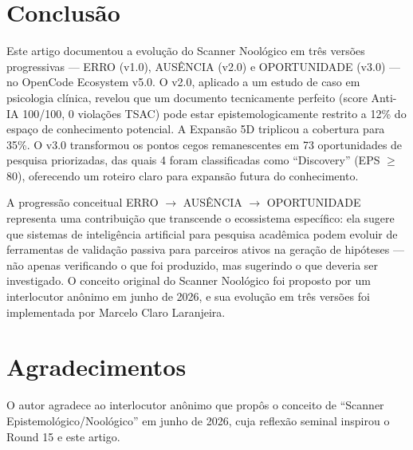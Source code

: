 \documentclass[12pt,a4paper]{article}
\begin{document}
\section{Conclusão}

Este artigo documentou a evolução do Scanner Noológico em três versões progressivas --- ERRO (v1.0), AUSÊNCIA (v2.0) e OPORTUNIDADE (v3.0) --- no OpenCode Ecosystem v5.0. O v2.0, aplicado a um estudo de caso em psicologia clínica, revelou que um documento tecnicamente perfeito (score Anti-IA 100/100, 0 violações TSAC) pode estar epistemologicamente restrito a 12\% do espaço de conhecimento potencial. A Expansão 5D triplicou a cobertura para 35\%. O v3.0 transformou os pontos cegos remanescentes em 73 oportunidades de pesquisa priorizadas, das quais 4 foram classificadas como ``Discovery'' (EPS $\geq$ 80), oferecendo um roteiro claro para expansão futura do conhecimento.

A progressão conceitual ERRO $\rightarrow$ AUSÊNCIA $\rightarrow$ OPORTUNIDADE representa uma contribuição que transcende o ecossistema específico: ela sugere que sistemas de inteligência artificial para pesquisa acadêmica podem evoluir de ferramentas de validação passiva para parceiros ativos na geração de hipóteses --- não apenas verificando o que foi produzido, mas sugerindo o que deveria ser investigado. O conceito original do Scanner Noológico foi proposto por um interlocutor anônimo em junho de 2026, e sua evolução em três versões foi implementada por Marcelo Claro Laranjeira.

\section*{Agradecimentos}

O autor agradece ao interlocutor anônimo que propôs o conceito de ``Scanner Epistemológico/Noológico'' em junho de 2026, cuja reflexão seminal inspirou o Round 15 e este artigo.
\end{document}
